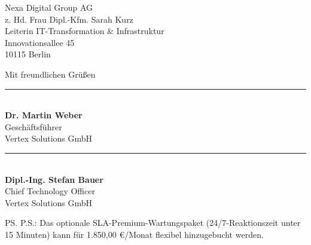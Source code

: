 \documentclass[11pt,a4paper]{dinbrief}
\begin{document}
\begin{letter}{%
  Nexa Digital Group AG\\
  z. Hd. Frau Dipl.-Kfm. Sarah Kurz\\
  Leiterin IT-Transformation \& Infrastruktur\\
  Innovationsallee 45\\
  10115 Berlin
}
\closing{Mit freundlichen Grüßen}

\vspace{0.6cm}
\noindent
\begin{minipage}[t]{0.45\textwidth}
  \rule{\textwidth}{0.4pt}\\[4pt]
  \textbf{Dr. Martin Weber}\\
  Geschäftsführer\\
  Vertex Solutions GmbH
\end{minipage}\hfill
\begin{minipage}[t]{0.45\textwidth}
  \rule{\textwidth}{0.4pt}\\[4pt]
  \textbf{Dipl.-Ing. Stefan Bauer}\\
  Chief Technology Officer\\
  Vertex Solutions GmbH
\end{minipage}

\vspace{0.4cm}
\ps{P.S.: Das optionale SLA-Premium-Wartungspaket (24/7-Reaktionszeit unter 15 Minuten) kann für 1.850,00 €/Monat flexibel hinzugebucht werden.}


\end{letter}
\end{document}
